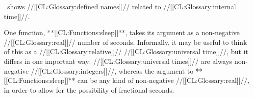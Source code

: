 \Thenextfigure\ shows //[[CL:Glossary:defined names]]// related to //[[CL:Glossary:internal time]]//.


\endsubsubsection%


One function, **[[CL:Functions:sleep]]**, takes its argument as a non-negative //[[CL:Glossary:real]]// number of seconds.  Informally, it may be useful to think of this as  a //[[CL:Glossary:relative]]// //[[CL:Glossary:universal time]]//, but it differs in one important way: //[[CL:Glossary:universal times]]// are always non-negative //[[CL:Glossary:integers]]//, whereas the argument to **[[CL:Functions:sleep]]** can be any kind of non-negative //[[CL:Glossary:real]]//, in order to allow for the possibility of fractional seconds.


\endsubsubsection%

\endsubsection%

